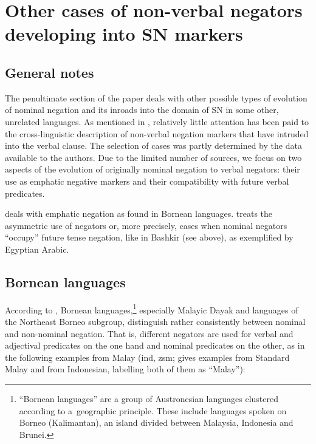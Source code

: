\documentclass[output=paper]{langsci/langscibook}
\begin{document}
\section{Other cases of non-verbal negators developing into SN markers}\label{sec:BK4}

\subsection{General notes}\label{sec:BK4.1}

The penultimate section of the paper deals with other possible types of evolution of nominal negation and its inroads into the domain of SN in some other, unrelated languages. As mentioned in , relatively little attention has been paid to the cross-linguistic description of non-verbal negation markers that have intruded into the verbal clause. The selection of cases was partly determined by the data available to the authors. Due to the limited number of sources, we focus on two aspects of the evolution of originally nominal negation to verbal negators: their use as emphatic negative markers and their compatibility with future verbal predicates.

 deals with emphatic negation as found in Bornean languages.  treats the asymmetric use of negators or, more precisely, cases when nominal negators “occupy” future tense negation, like in Bashkir (see  above), as exemplified by Egyptian Arabic.

\subsection{Bornean languages}\label{sec:BK4.2}

According to \citet{kroeger2014a}, Bornean languages,\footnote{“Bornean languages” are a group of Austronesian languages clustered according to a geographic principle. These include languages spoken on Borneo (Kalimantan), an island divided between Malaysia, Indonesia and Brunei.} especially Malayic Dayak and languages of the Northeast Borneo subgroup, distinguish rather consistently between nominal and non-nominal negation. That is, different negators are used for verbal and adjectival predicates on the one hand and nominal predicates on the other, as in the following examples from Malay (ind, zsm; \citeauthor{kroeger2014a} gives examples from Standard Malay and from Indonesian, labelling both of them as “Malay”):
\end{document}
